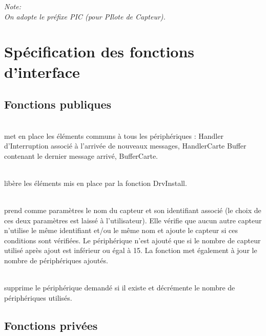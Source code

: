 
\textsl{
Note:\\
On adopte le préfixe PIC (pour PIlote de Capteur).
}

\section{Spécification des fonctions d'interface}

\subsection{Fonctions publiques}

\begin{m_desc}

 \item [PIC\_DrvInstall] \hfill\\
 met en place les éléments communs à tous les périphériques :
Handler d'Interruption associé à l'arrivée de nouveaux messages, HandlerCarte
Buffer contenant le dernier message arrivé, BufferCarte.
 \item [PIC\_DrvRemove] \hfill\\
libère les éléments mis en place par la fonction DrvInstall.

 \item [PIC\_DevAdd] \hfill\\
 prend comme paramètres le nom du capteur et son identifiant associé (le choix de ces deux paramètres est laissé à l'utilisateur). Elle vérifie que aucun autre capteur n'utilise le même identifiant et/ou le même nom et ajoute le capteur si ces conditions sont vérifiées.
Le périphérique n'est ajouté que si le nombre de capteur utilisé après ajout est inférieur ou égal à 15. La fonction met également à jour le nombre de périphériques ajoutés.

 \item [PIC\_DevDelete] \hfill\\
supprime le périphérique demandé si il existe et décrémente le nombre de périphériques utilisés.

\end{m_desc}

\subsection{Fonctions privées}

